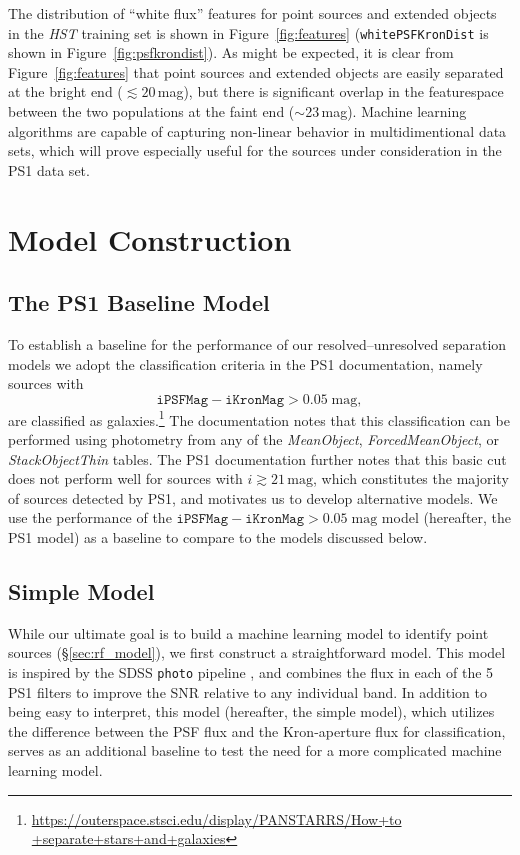 \documentclass[twocolumn, dvipdfmx]{aastex62}
\begin{document}
\begin{CJK*}{UTF8}{gbsn}
The distribution of ``white flux'' features for point sources and extended objects in the
\textit{HST} training set is shown in Figure~\ref{fig:features}
(\texttt{whitePSFKronDist} is shown in Figure~\ref{fig:psfkrondist}). As
might be expected, it is clear from Figure~\ref{fig:features} that point
sources and extended objects are easily separated at the bright end
($\lesssim 20$\,mag), but there is significant overlap in the featurespace
between the two populations at the faint end ($\sim$23\,mag). Machine
learning algorithms are capable of capturing non-linear behavior in
multidimentional data sets, which will prove especially useful for the
sources under consideration in the PS1 data set.

\section{Model Construction}
\subsection{The PS1 Baseline Model}\label{sec:ps1_model}

To establish a baseline for the performance of our resolved--unresolved
separation models we adopt the classification criteria in the PS1
documentation, namely sources with 
% 
$$ \mathtt{iPSFMag} - \mathtt{iKronMag}
> 0.05\;\mathrm{mag},$$ 
% 
are classified as
galaxies.\footnote{\url{https://outerspace.stsci.edu/display/PANSTARRS/How+to
 +separate+stars+and+galaxies}} The documentation notes that this
classification can be performed using photometry from any of the
\textit{MeanObject}, \textit{ForcedMeanObject}, or \textit{StackObjectThin}
tables. The PS1 documentation further notes that this basic cut does not
perform well for sources with $i \gtrsim 21\,\mathrm{mag}$, which
constitutes the majority of sources detected by PS1, and motivates us to
develop alternative models. We use the performance of the $\mathtt{iPSFMag}
- \mathtt{iKronMag} > 0.05\;\mathrm{mag}$ model (hereafter, the PS1 model)
as a baseline to compare to the models discussed below.

\subsection{Simple Model}\label{sec:simple_model}

While our ultimate goal is to build a machine learning model to identify
point sources (\S\ref{sec:rf_model}), we first construct a straightforward
model. This model is inspired by the SDSS \texttt{photo} pipeline
\citep{Lupton01}, and combines the flux in each of the 5 PS1 filters to
improve the SNR relative to any individual band. In addition to being easy
to interpret, this model (hereafter, the simple model), which utilizes the
difference between the PSF flux and the Kron-aperture flux for
classification, serves as an additional baseline to test the need for a more
complicated machine learning model.


\end{CJK*}
\end{document}
